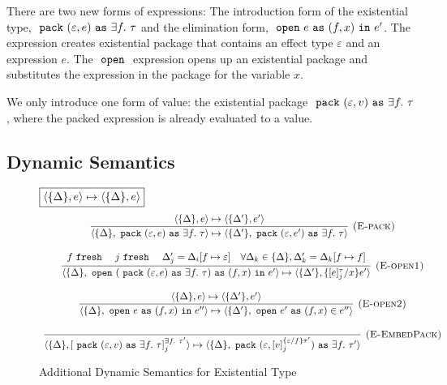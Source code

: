 There  are two new forms of expressions: The introduction form of the existential type, $\ \texttt{pack}\  (\varepsilon, e) \ \texttt{as}\  \exists f.\ \tau$ and the elimination form, $\ \texttt{open}\  e \ \texttt{as}\  (f, x) \ \texttt{in}\  e'$. The  expression creates existential package that contains an effect type $\varepsilon$ and an expression $e$.  The $\ \texttt{open}\ $ expression opens up an existential package and substitutes the expression in the package for the variable $x$.

We only introduce one form of value: the existential package $\m{pack} (\varepsilon, v) \m{as} \exists f.\ \tau$, where the packed expression is already evaluated to a value.


\subsection{Dynamic Semantics}
\begin{figure}[t]
\footnotesize{
\noindent$\fbox{$\langle \{\Delta\}, e \rangle \mapsto \langle \{\Delta\}, e \rangle$}$
\[
\begin{array}{c}

\infer[\textsc{(E-pack)}]
  {\langle \{\Delta\}, \m{pack} (\varepsilon, e) \m{as} \exists f.\ \tau  \rangle \mapsto \langle \{\Delta'\} , \m{pack} (\varepsilon, e') \m{as} \exists f.\ \tau  \rangle}
  {\langle \{\Delta\}, e \rangle \mapsto \langle \{\Delta'\}, e' \rangle} \\[3ex]
  
\infer[\textsc{(E-open1)}]
   {\langle \{\Delta\},  \m{open} (\m{pack} (\varepsilon, e) \m{as} \exists f.\ \tau) \m{as} (f, x) \m{in} e'  \rangle \mapsto \langle \{\Delta'\}, \{[e]_j^\tau / x\}e' \rangle}
  {f \m{fresh} & j \m{fresh} & \Delta'_j = \Delta_i[f \mapsto \varepsilon] & \forall \Delta_k \in \{\Delta\}, \Delta_k' = \Delta_k[f \mapsto f]} \\[3ex]
  
\infer[\textsc{(E-open2)}]
   {\langle \{\Delta\},  \m{open} e \m{as} (f, x) \m{in} e''  \rangle \mapsto \langle \{\Delta'\}, \m{open} e' \m{as} (f, x) \in e''\rangle}
  {\langle \{\Delta\}, e \rangle \mapsto \langle \{\Delta'\}, e' \rangle} \\[3ex]
  
\infer[\textsc{(E-EmbedPack)}]
  {\langle \{\Delta\}, [\m{pack} (\varepsilon, v) \m{as} \exists f.\ \tau]^{\exists f.\ \tau'}_j \rangle \mapsto \langle \{\Delta\}, \m{pack} (\varepsilon, [v]^{\{\varepsilon/f\}\tau'}_j) \m{as} \exists f.\ \tau' \rangle}
  {}
  
\end{array}
\]
\caption{Additional Dynamic Semantics for Existential Type}
\label{static-exist}
}
\end{figure}


